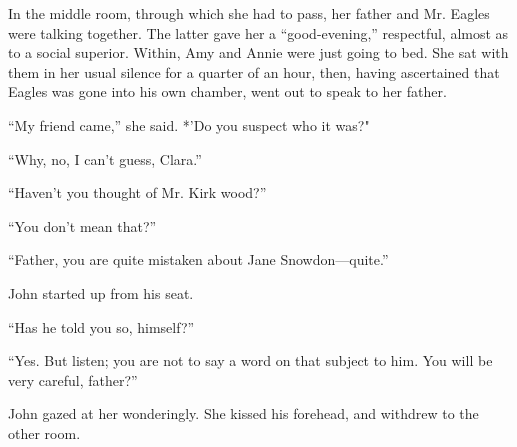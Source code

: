 In the middle room, through which she had to pass, her father and Mr.
Eagles were talking together. The latter gave her a ``good-evening,''
respectful, almost as to a social {\protect\hypertarget{92}{}{}}
superior. Within, Amy and Annie were just going to bed. She sat with
them in her usual silence for a quarter of an hour, then, having
ascertained that Eagles was gone into his own chamber, went out to speak
to her father.

``My friend came,'' she said. *'Do you suspect who it was?"

``Why, no, I can't guess, Clara.''

``Haven't you thought of Mr. Kirk wood?''

``You don't mean that?''

``Father, you are quite mistaken about Jane Snowdon---quite.''

John started up from his seat.

``Has he told you so, himself?''

``Yes. But listen; you are not to say a word on that subject to him. You
will be very careful, father?''

John gazed at her wonderingly. She kissed his forehead, and withdrew to
the other room.
